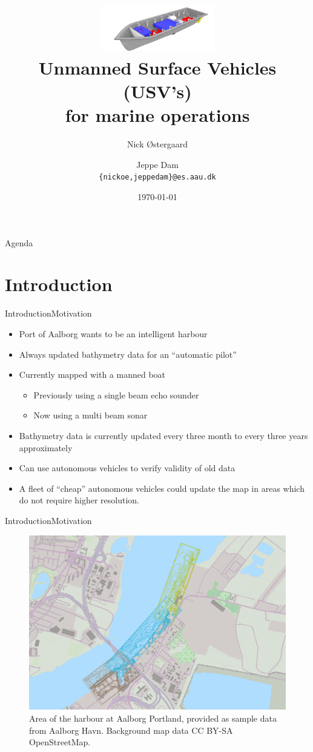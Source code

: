 \documentclass[10pt,handout]{beamer}
\title[USV's for marine operations]%
{\includegraphics[width=5cm]{../thesis/frontmatter/aauship}\\ Unmanned Surface Vehicles (USV's)\\ for marine operations}
\author[14gr1034]{%
  Nick Østergaard \and Jeppe Dam\\
  {{\tt \{nickoe,jeppedam\}@es.aau.dk}}
}
\institute[
  Dept.\ of Electronic Systems,\\
  Aalborg University,\\
  Denmark
] %
{%
  Department of Electronic Systems,\\
  Aalborg University,\\
  Denmark
  
}
\date{\today}
\begin{document}
\begin{frame}[plain] %
  \titlepage
\end{frame}

\begin{frame}{Agenda}{}
\tableofcontents
\end{frame}
\section{Introduction}
\begin{frame}{Introduction}{Motivation}
  \begin{itemize}
    \item Port of Aalborg wants to be an intelligent harbour
    \item Always updated bathymetry data for an ``automatic pilot''
    \item Currently mapped with a manned boat
    \begin{itemize}
      \item Previously using a single beam echo sounder
      \item Now using a multi beam sonar
    \end{itemize}
    \item Bathymetry data is currently updated every three month to every three years approximately
    \item Can use autonomous vehicles to verify validity of old data
    \item A fleet of ``cheap'' autonomous vehicles could update the map in areas which do not require higher resolution.
  \end{itemize}
\end{frame}

\begin{frame}{Introduction}{Motivation}
  \begin{figure}
	  \includegraphics[width=\textwidth]{../thesis/fig/use-case-data}
	  \caption{\scriptsize Area of the harbour at Aalborg Portland, provided as sample
	  data from Aalborg Havn. Background map data CC BY-SA OpenStreetMap.}
  \end{figure}
\end{frame}
\end{document}
